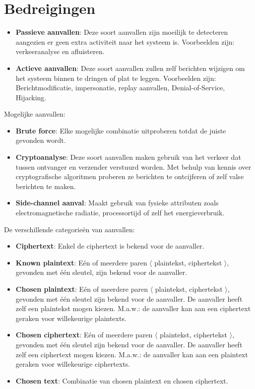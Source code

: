 \documentclass{report}
\begin{document}
	\section{Bedreigingen}
	\begin{itemize}
		\item \textbf{Passieve aanvallen}: Deze soort aanvallen zijn moeilijk te detecteren aangezien er geen extra activiteit naar het systeem is. Voorbeelden zijn: verkeeranalyse en afluisteren.
		\item \textbf{Actieve aanvallen}: Deze soort aanvallen zullen zelf berichten wijzigen om het systeem binnen te dringen of plat te leggen. Voorbeelden zijn: Berichtmodificatie, impersonatie, replay aanvallen, Denial-of-Service, Hijacking.
	\end{itemize}
	Mogelijke aanvallen:
	\begin{itemize}
		\item \textbf{Brute force}: Elke mogelijke combinatie uitproberen totdat de juiste gevonden wordt.
		\item \textbf{Cryptoanalyse}: Deze soort aanvallen maken gebruik van het verkeer dat tussen ontvanger en verzender verstuurd worden. Met behulp van kennis over cryptografische algoritmen proberen ze berichten te ontcijferen of zelf valse berichten te maken.
		\item \textbf{Side-channel aanval}: Maakt gebruik van fysieke attributen zoals electromagnetische radiatie, processortijd of zelf het energieverbruik.  
	\end{itemize}
	De verschillende categorieën van aanvallen:
	\begin{itemize}
		\item \textbf{Ciphertext}: Enkel de ciphertext is bekend voor de aanvaller.
		\item \textbf{Known plaintext}: Eén of meerdere paren $\langle$ plaintekst, ciphertekst $\rangle$, gevonden met één sleutel, zijn bekend voor de aanvaller.
		\item \textbf{Chosen plaintext}: Eén of meerdere paren $\langle$ plaintekst, ciphertekst $\rangle$, gevonden met één sleutel zijn bekend voor de aanvaller. De aanvaller heeft zelf een plaintekst mogen kiezen. M.a.w.: de aanvaller kan aan een ciphertext geraken voor willekeurige plaintexts.
		\item \textbf{Chosen ciphertext}: Eén of meerdere paren $\langle$ plaintekst, ciphertekst $\rangle$, gevonden met één sleutel zijn bekend voor de aanvaller. De aanvaller heeft zelf een ciphertext mogen kiezen. M.a.w.: de aanvaller kan aan een plaintext geraken voor willekeurige  ciphertexts.
		\item \textbf{Chosen text}: Combinatie van chosen plaintext en chosen ciphertext.
	\end{itemize}
\end{document}
